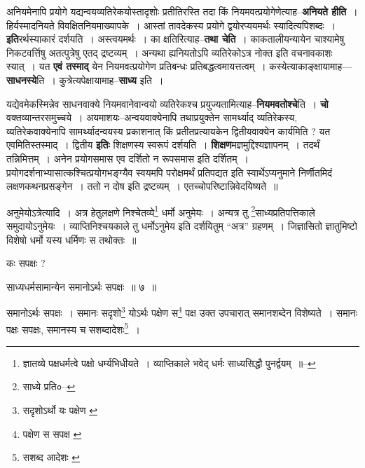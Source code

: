 \documentclass[article,12pt,a4paper]{memoir}
\begin{document}
	  \pstart अनियमेनापि प्रयोगे यद्यन्वयव्यतिरेकयोस्तादृशोः प्रतीतिरस्ति तदा किं नियमवत्प्रयोगेणेत्याह--\textbf{अनियते हीति} । हिर्यस्मादनियते विवक्षितनियमाख्यापके । आस्तां तावदेकस्य प्रयोगे द्वयोरप्ययमर्थः स्यादित्यपिशब्दः । \textbf{इति}रर्थस्याकारं दर्शयति । अस्त्वयमर्थः । का क्षतिरित्याह--\textbf{तथा चेति} । काकतालीयन्यायेन चाश्यामेषु निकटवर्त्तिषु अतत्पुत्रेषु एतद् द्रष्टव्यम् । अन्यथा ह्यनियतोऽपि व्यतिरेकोऽत्र नोक्त इति वचनावकाशः स्यात् । यत \textbf{एवं तस्माद्} येन नियमवत्प्रयोगेण प्रतिबन्धः प्रतिबद्धत्वमायत्तत्वम् । कस्येत्याकाङ्क्षायामाह—\textbf{साधनस्ये}ति । कुत्रेत्यपेक्षायामाह--\textbf{साध्य} इति ।
	\pend
      

	  \pstart यद्येवमेकस्मिन्नेव साधनवाक्ये नियमवानेवान्वयो व्यतिरेकश्च प्रयुज्यतामित्याह--\textbf{नियमवतोश्चे}ति । \textbf{चो} वक्तव्यान्तरसमुच्चये । अयमाशयः--अन्वयवाक्येनापि तथाप्रयुक्तेन सामर्थ्याद् व्यतिरेकस्य, व्यतिरेकवाक्येनापि सामर्थ्यादन्वयस्य प्रकाशनात् किं प्रतीतप्रत्यायकेन द्वितीयवाक्येन कार्यमिति ? यत एवमितिस्तस्माद् । द्वितीय \textbf{इतिः} शिक्षणस्य स्वरूपं दर्शयति । \textbf{शिक्षण}मज्ञमुद्दिश्यज्ञापनम् । तदर्थं तन्निमित्तम् । अनेन प्रयो\leavevmode{}गसमास एव दर्शितो न रूपसमास इति दर्शितम् । प्रयोगदर्शनाभ्यासात्कश्चित्प्रयोगभङ्ग्यैव स्वयमपि परोक्षमर्थं प्रतिपद्यत इति स्वार्थेऽप्यनुमाने निर्णीतमिदं लक्षणकथनप्रसङ्गेन । ततो न दोष इति द्रष्टव्यम् । एतच्चोपरिष्टान्निवेदयिष्यते ॥
	\pend
      \leavevmode{}
	  \bigskip
	  \begingroup
	

	  \pstart अनुमेयोऽत्रेत्यादि । अत्र हेतुलक्षणे निश्चेतव्ये\footnote{ज्ञातव्ये पक्षधर्मत्वे पक्षो धर्म्यभिधीयते । व्याप्तिकाले भवेद् धर्मः साध्यसिद्धौ पुनर्द्वयम् ॥--\cite{dp-msD-n}} धर्मो अनुमेयः । अन्यत्र तु \footnote{साध्ये प्रति०--\cite{dp-msC}}साध्यप्रतिपत्तिकाले समुदायोऽनुमेयः । व्याप्तिनिश्चयकाले तु धर्मोऽनुमेय इति दर्शयितुम् “अत्र” ग्रहणम् । जिज्ञासितो ज्ञातुमिष्टो विशेषो धर्मो यस्य धर्मिणः स तथोक्तः ॥
	\pend
       

	  \pstart कः सपक्षः ?
	\pend
       
	  \bigskip
	  \begingroup
	

	  \pstart साध्यधर्मसामान्येन समानोऽर्थः सपक्षः ॥ ७ ॥
	\pend
      
	  \endgroup
	 

	  \pstart समानोऽर्थः सपक्षः । समानः सदृशो\footnote{सदृशोऽर्थो यः पक्षेण \cite{dp-msC}} योऽर्थः पक्षेण स\footnote{पक्षेण स सपक्ष \cite{dp-msB} \cite{dp-msC} \cite{dp-msD} \cite{dp-edP} \cite{dp-edH} \cite{dp-edE} \cite{dp-edN}} पक्ष उक्त उपचारात् समानशब्देन विशेष्यते । समानः पक्षः सपक्षः, समानस्य च सशब्दादेशः\footnote{सशब्द आदेशः \cite{dp-edE}} ।
	\pend
      
\end{document}
